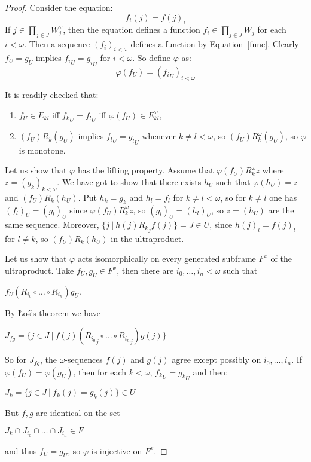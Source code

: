 \documentclass{article}
\theoremstyle{defin}
\theoremstyle{theorem}
\theoremstyle{claim}
\theoremstyle{prop}
\theoremstyle{lemma}
\theoremstyle{fact}
\theoremstyle{remark}
\theoremstyle{ex}
\theoremstyle{col}
\theoremstyle{question}
\let\strokeL\L
\renewcommand\L{\mathbf{L}}
\begin{document}
\begin{proof}
Consider the equation:
\begin{equation} \label{func}
f_i(j) = f(j)_i
\end{equation}
If $j \in \prod \limits_{j \in J} W^{\omega}_{j}$, then the equation defines a function $f_i \in \prod_{j \in J} W_j$ for each $i < \omega$. Then a sequence $(f_i)_{i < \omega}$ defines a function by Equation~\ref{func}. Clearly $f_U = g_U$ implies ${f_i}_U = {g_i}_U$ for $i < \omega$. So define $\varphi$ as:
\begin{equation}
\varphi(f_U) = ({f_i}_U)_{i < \omega}
\end{equation}

It is readily checked that:
\begin{enumerate}
\item $f_U \in E_{k l}$ iff ${f_k}_U = {f_l}_U$ iff $\varphi(f_U) \in E^{\omega}_{k l}$,
\item $(f_U) R_k (g_U)$ implies ${f_l}_U = {g_l}_U$ whenever $k \neq l < \omega$, so $(f_U) R^{\omega}_k (g_U)$, so $\varphi$ is monotone.
\end{enumerate}
Let us show that $\varphi$ has the lifting property. Assume that $\varphi(f_U) R^{\omega}_k z$ where $z = (g_k)_{k < \omega}$. We have got to show that there exists $h_U$ such that $\varphi(h_U) = z$ and $(f_U) R_k (h_U)$. Put $h_k = g_k$ and $h_l = f_l$ for $k \neq l < \omega$, so for $k \neq l$ one has $(f_l)_U = (g_l)_U$ since $\varphi(f_U) R^{\omega}_k z$, so $(g_l)_U = (h_l)_U$, so $z = (h_U)$ are the same sequence. Moreover, $\{ j \: | \: h(j) {R_k}_j f(j)\} = J \in U$, since $h(j)_l = f(j)_l$ for $l \neq k$, so $(f_U) R_k (h_U)$ in the ultraproduct.

\vspace{\baselineskip}

Let us show that $\varphi$ acts isomorphically on every generated subframe $F^{x}$ of the ultraproduct. Take $f_U, g_U \in F^{x}$, then there are $i_0, \dots, i_n < \omega$ such that
\begin{center}
$f_U(R_{i_0} \circ \dots \circ R_{i_n})g_U$.
\end{center}
By \strokeL o\'s's theorem we have
\begin{center}
$J_{fg} = \{ j \in J \: | \: f(j)({R_{i_0}}_j \circ \dots \circ {R_{i_n}}_j)g(j) \}$
\end{center}
So for $J_{fg}$, the $\omega$-sequences $f(j)$ and $g(j)$ agree except possibly on $i_0, \dots, i_n$. If $\varphi(f_U) = \varphi(g_U)$, then for each $k < \omega$, ${f_k}_U = {g_k}_U$ and then:
\begin{center}
$J_k = \{ j \in J \: | \: f_k(j) = g_k(j) \} \in U$
\end{center}
But $f, g$ are identical on the set
\begin{center}
$J_k \cap J_{i_0} \cap \dots \cap J_{i_n} \in F$
\end{center}
and thus $f_U = g_U$, so $\varphi$ is injective on $F^{x}$.
\end{proof}
\end{document}
